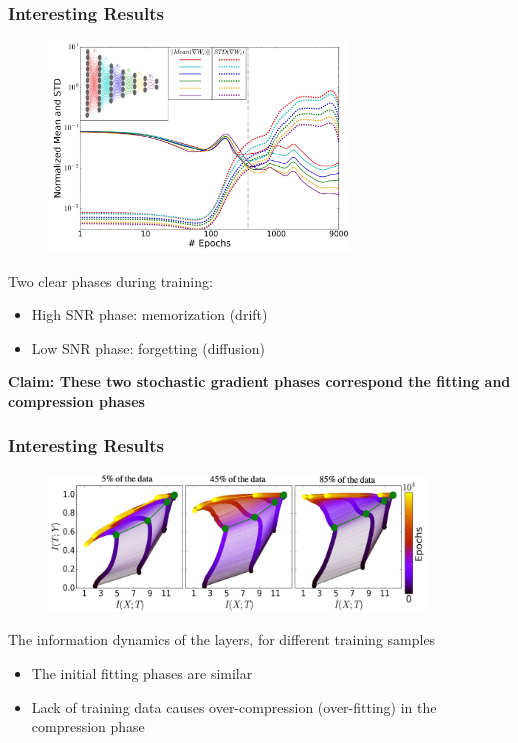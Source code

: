 \documentclass{beamer}
\begin{document}
\begin{frame}
    \frametitle{Interesting Results}
    \vspace{-0.25cm}
    \begin{figure}
        \centering
        \includegraphics[width=8cm]{mean_std.jpg}
    \end{figure}
    \vspace{-0.4cm}
    Two clear phases during training: 
    \begin{itemize}
        \item High SNR phase: memorization (drift)
        \item Low SNR phase: forgetting (diffusion)
    \end{itemize}
    \textbf{Claim: These two stochastic gradient phases correspond the fitting and compression phases}
\end{frame}

\begin{frame}
    \frametitle{Interesting Results}
    \begin{figure}
        \centering
        \includegraphics[width=10cm]{info_plane_data.jpg}
    \end{figure}
    The information dynamics of the layers, for different training samples
    \begin{itemize}
        \item The initial fitting phases are similar
        \item Lack of training data causes over-compression (over-fitting) in the compression phase
    \end{itemize}
\end{frame}
\end{document}
